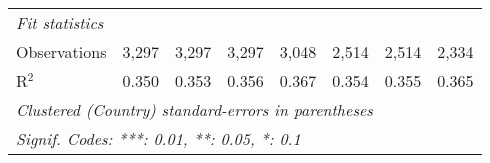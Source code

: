 \begin{tabular}{lccccccc}
   \midrule \emph{Fit statistics}\\
   Observations                                                   & 3,297          & 3,297          & 3,297          & 3,048         & 2,514         & 2,514         & 2,334\\  
   R$^2$                                                          & 0.350          & 0.353          & 0.356          & 0.367         & 0.354         & 0.355         & 0.365\\  
   \midrule
   \multicolumn{8}{l}{\emph{Clustered (Country) standard-errors in parentheses}}\\
   \multicolumn{8}{l}{\emph{Signif. Codes: ***: 0.01, **: 0.05, *: 0.1}}\\
\end{tabular}
\par\endgroup


